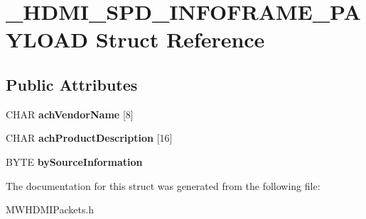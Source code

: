 \hypertarget{struct__HDMI__SPD__INFOFRAME__PAYLOAD}{\section{\-\_\-\-H\-D\-M\-I\-\_\-\-S\-P\-D\-\_\-\-I\-N\-F\-O\-F\-R\-A\-M\-E\-\_\-\-P\-A\-Y\-L\-O\-A\-D Struct Reference}
\label{struct__HDMI__SPD__INFOFRAME__PAYLOAD}
}
\subsection*{Public Attributes}
\begin{DoxyCompactItemize}
\item 
\hypertarget{struct__HDMI__SPD__INFOFRAME__PAYLOAD_a45e47ea3c6680db2a642a637c4df3d87}{C\-H\-A\-R {\bfseries ach\-Vendor\-Name} \mbox{[}8\mbox{]}}\label{struct__HDMI__SPD__INFOFRAME__PAYLOAD_a45e47ea3c6680db2a642a637c4df3d87}

\item 
\hypertarget{struct__HDMI__SPD__INFOFRAME__PAYLOAD_a812b8132f46c016d0f552ce44bbdcb71}{C\-H\-A\-R {\bfseries ach\-Product\-Description} \mbox{[}16\mbox{]}}\label{struct__HDMI__SPD__INFOFRAME__PAYLOAD_a812b8132f46c016d0f552ce44bbdcb71}

\item 
\hypertarget{struct__HDMI__SPD__INFOFRAME__PAYLOAD_a8391c99f882de19f340a87f9140653c6}{B\-Y\-T\-E {\bfseries by\-Source\-Information}}\label{struct__HDMI__SPD__INFOFRAME__PAYLOAD_a8391c99f882de19f340a87f9140653c6}

\end{DoxyCompactItemize}


The documentation for this struct was generated from the following file\-:\begin{DoxyCompactItemize}
\item 
M\-W\-H\-D\-M\-I\-Packets.\-h\end{DoxyCompactItemize}
